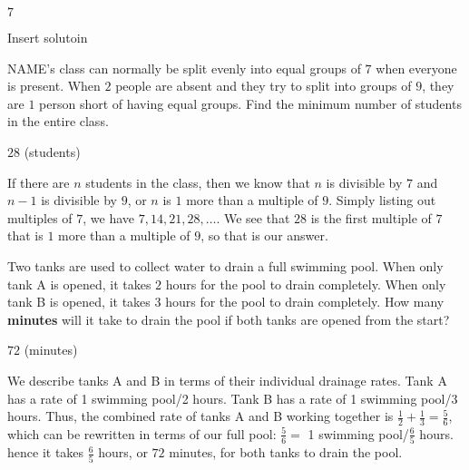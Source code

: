 \documentclass[11pt]{article}
\begin{document}
\begin{answer}
$\boxed{7}$
\end{answer}

\begin{solution}
Insert solutoin
\end{solution}


\begin{problem}
NAME's class can normally be split evenly into equal groups of $7$ when everyone is present. When $2$ people are absent and they try to split into groups of $9$, they are $1$ person short of having equal groups. Find the minimum number of students in the entire class.
\end{problem}

\begin{answer}
$\boxed{28}$ (students)
\end{answer}

\begin{solution}
If there are $n$ students in the class, then we know that $n$ is divisible by $7$ and $n-1$ is divisible by $9$, or $n$ is $1$ more than a multiple of $9$. Simply listing out multiples of $7$, we have $7, 14, 21, 28, \ldots$. We see that $\boxed{28}$ is the first multiple of $7$ that is $1$ more than a multiple of $9$, so that is our answer.
\end{solution}


\begin{problem}%
Two tanks are used to collect water to drain a full swimming pool. When only tank A is opened, it takes $2$ hours for the pool to drain completely. When only tank B is opened, it takes $3$ hours for the pool to drain completely. How many \textbf{minutes} will it take to drain the pool if both tanks are opened from the start?
\end{problem}

\begin{answer}
$\boxed{72}$ (minutes)
\end{answer}

\begin{solution}
We describe tanks A and B in terms of their individual drainage rates. Tank A has a rate of 1 swimming pool/2 hours. Tank B has a rate of 1 swimming pool/3 hours. Thus, the combined rate of tanks A and B working together is $\frac{1}{2} + \frac{1}{3} = \frac{5}{6}$, which can be rewritten in terms of our full pool: $\frac{5}{6} =$ 1 swimming pool/$\frac{6}{5}$ hours. hence it takes $\frac{6}{5}$ hours, or $\boxed{72}$ minutes, for both tanks to drain the pool.
\end{solution}
\end{document}
